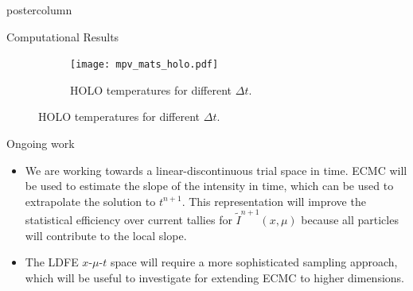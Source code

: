 \documentclass[xcolor=dvipsnames]{beamer}
\newcommand{\colb}[1]{{\color{blue} #1}}
\begin{document}
\begin{frame}
\begin{columns}
\begin{column}{.49\textwidth}
\begin{beamercolorbox}[center,wd=\textwidth]{postercolumn}
\begin{minipage}[T]{0.95\textwidth}
{\begin{block}{Computational Results}
\begin{figure}
\begin{subfigure}{0.49\textwidth}
\centering
    \texttt{[image: mpv\_mats\_holo.pdf]}
    \caption{HOLO temperatures for different $\Delta t$.\label{twomat_quick}}
\end{subfigure}
\end{figure}
    \vspace{1.5em}
\centering 
    \end{block}

     \vfill
    \begin{block}{Ongoing work}
    \begin{itemize}
        \setlength\itemsep{0.25em}
        \item We are working towards a \colb{linear-discontinuous} trial space in time.  ECMC will be used to estimate
              the slope of the intensity in time, which can be used to extrapolate the
              solution to $t^{n+1}$. This  
              representation will improve the statistical efficiency over current tallies
              for $\tilde I^{n+1}(x,\mu)$ because all particles will contribute to the
              local slope.
        \item The LDFE $x$-$\mu$-$t$ space will require a more sophisticated sampling
            approach, which will be useful to investigate for extending
              ECMC to higher dimensions.
        \end{itemize}
    \end{block}
     \vfill
}
\end{minipage}
\end{beamercolorbox}
\end{column}

\end{columns}
\end{frame}
\end{document}
